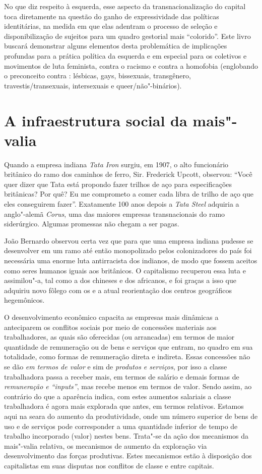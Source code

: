No que diz respeito à esquerda, esse aspecto da transnacionalização do
capital toca diretamente na questão do ganho de expressividade das
políticas identitárias, na medida em que elas adentram o processo de
seleção e disponibilização de sujeitos para um quadro gestorial mais
``colorido''. Este livro buscará demonstrar alguns elementos desta
problemática de implicações profundas para a prática política da
esquerda e em especial para os coletivos e movimentos de luta feminista,
contra o racismo e contra a homofobia (englobando o preconceito contra
: lésbicas, gays, bissexuais, transgênero, travestis/transexuais,
intersexuais e queer/não"-binários).

\chapter{A infraestrutura social da mais"-valia}

Quando a empresa indiana \emph{Tata Iron} surgiu, em 1907, o alto
funcionário britânico do ramo dos caminhos de ferro, Sir. Frederick
Upcott, observou: ``Você quer dizer que Tata está propondo fazer trilhos
de aço para especificações britânicas? Por quê? Eu me comprometo a comer
cada libra de trilho de aço que eles conseguirem fazer''. Exatamente 100
anos depois a \emph{Tata Steel} adquiria a anglo"-alemã \emph{Corus}, uma
das maiores empresas transnacionais do ramo siderúrgico. Algumas
promessas não chegam a ser pagas.

João Bernardo observou certa vez que para que uma empresa indiana
pudesse se desenvolver em um ramo até então monopolizado pelos
colonizadores do país foi necessária uma enorme luta antirracista dos
indianos, de modo que fossem aceitos como seres humanos iguais aos
britânicos. O capitalismo recuperou essa luta e assimilou"-a, tal como a
dos chineses e dos africanos, e foi graças a isso que adquiriu novo
fôlego com os  e a atual reorientação dos centros geográficos
hegemônicos.

O desenvolvimento econômico capacita as empresas mais dinâmicas a
anteciparem os conflitos sociais por meio de concessões materiais aos
trabalhadores, as quais são oferecidas (ou arrancadas) em termos de
maior quantidade de remuneração ou de bens e serviços que entram, no
quadro em sua totalidade, como formas de remuneração direta e indireta.
Essas concessões não se dão \emph{em termos de valor} e sim de
\emph{produtos e serviços}, por isso a classe trabalhadora passa a
receber mais, em termos de salário e demais formas de \emph{remuneração
e ``inputs''}, mas recebe menos em termos de valor. Sendo assim, ao
contrário do que a aparência indica, com estes aumentos salariais a
classe trabalhadora é agora mais explorada que antes, em termos
relativos. Estamos aqui na seara do aumento da produtividade, onde um
número superior de bens de uso e de serviços pode corresponder a uma
quantidade inferior de tempo de trabalho incorporado (valor) nestes
bens. Trata"-se da ação dos mecanismos da mais"-valia relativa, os
mecanismos de aumento da exploração via desenvolvimento das forças
produtivas. Estes mecanismos estão à disposição dos capitalistas em suas
disputas nos conflitos de classe e entre capitais.

